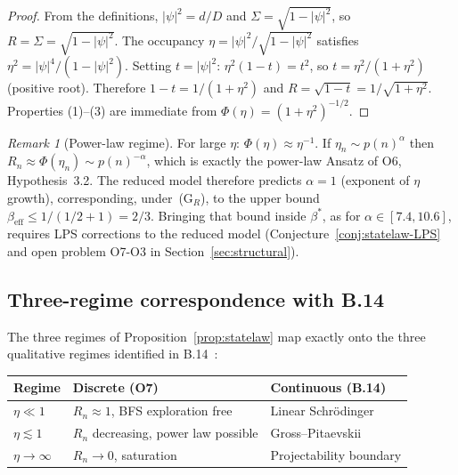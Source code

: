 \documentclass[11pt,a4paper]{article}
\theoremstyle{definition}
\theoremstyle{remark}
\newtheorem{remark}[theorem]{Remark}
\newcommand{\beff}{\beta_{\mathrm{eff}}}
\begin{document}
    \begin{proof}
      From the definitions, $|\psi|^2 = d/D$ and $\Sigma = \sqrt{1-|\psi|^2}$, so
      $R = \Sigma = \sqrt{1-|\psi|^2}$.
      The occupancy $\eta = |\psi|^2/\sqrt{1-|\psi|^2}$ satisfies $\eta^2 = |\psi|^4/(1-|\psi|^2)$.
      Setting $t = |\psi|^2$: $\eta^2(1-t) = t^2$, so $t = \eta^2/(1+\eta^2)$ (positive root).
      Therefore $1-t = 1/(1+\eta^2)$ and $R = \sqrt{1-t} = 1/\sqrt{1+\eta^2}$.
      Properties (1)--(3) are immediate from $\Phi(\eta) = (1+\eta^2)^{-1/2}$.
    \end{proof}

    \begin{remark}[Power-law regime]
      \label{rem:powerlaw}
      For large $\eta$: $\Phi(\eta) \approx \eta^{-1}$.
      If $\eta_n \sim p(n)^\alpha$ then $R_n \approx \Phi(\eta_n) \sim p(n)^{-\alpha}$,
      which is exactly the power-law Ansatz of O6, Hypothesis~3.2.
      The reduced model therefore predicts $\alpha = 1$ (exponent of $\eta$ growth),
      corresponding, under~(G$_R$), to the upper bound $\beff \leq 1/(1/2+1) = 2/3$.
      Bringing that bound inside $\beta^*$, as for $\alpha \in [7.4, 10.6]$, requires LPS corrections to
      the reduced model
      (Conjecture~\ref{conj:statelaw-LPS} and open problem O7-O3 in Section~\ref{sec:structural}).
    \end{remark}

  \subsection{Three-regime correspondence with B.14}
    \label{ssec:regimes}

    The three regimes of Proposition~\ref{prop:statelaw} map exactly onto the three qualitative
    regimes identified in B.14~\cite{Cosmochrony}:

    \begin{center}
      \begin{tabular}{lll}
        \toprule
        Regime            & Discrete (O7)                         & Continuous (B.14)       \\
        \midrule
        $\eta \ll 1$      & $R_n \approx 1$, BFS exploration free & Linear Schr\"{o}dinger  \\
        $\eta \lesssim 1$ & $R_n$ decreasing, power law possible  & Gross--Pitaevskii       \\
        $\eta \to \infty$ & $R_n \to 0$, saturation               & Projectability boundary \\
        \bottomrule
      \end{tabular}
    \end{center}
\end{document}
